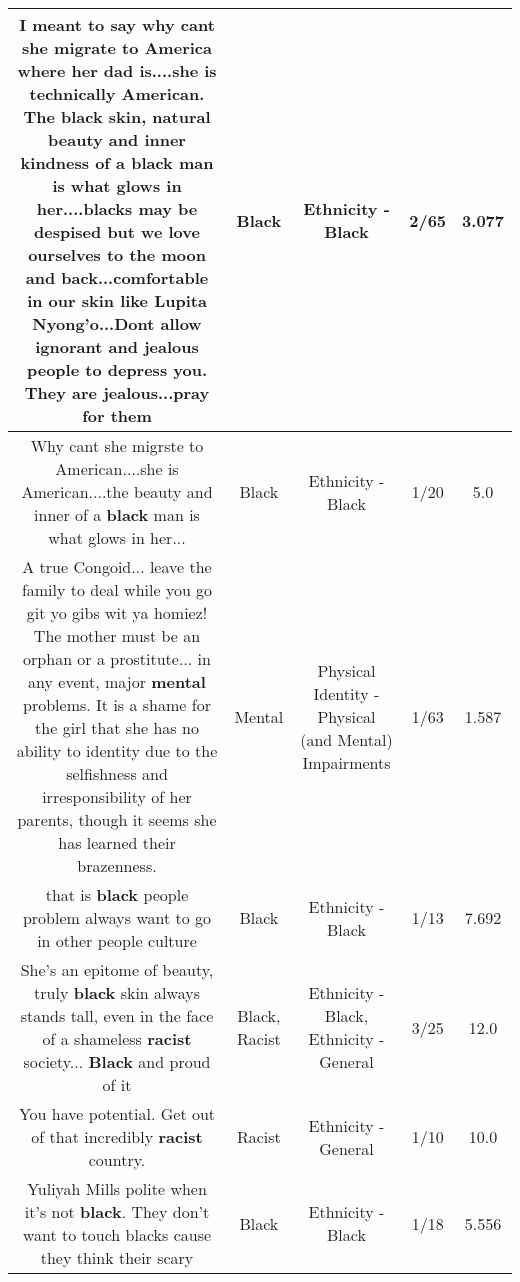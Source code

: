 \documentclass[11pt]{article}
\newlength\mylength
\begin{document}
\begin{center}
\begin{longtable}{|C{.65\mylength}|C{.30\mylength}|C{.12\mylength}|C{.12\mylength}|C{.12\mylength}|}
  \small I meant to say why cant she migrate to America where her dad is....she is technically American. The \textbf{black} skin, natural beauty and inner kindness of a \textbf{black} man is what glows in her....blacks may be despised but we love ourselves to the moon and back...comfortable in our skin like Lupita Nyong'o...Dont allow ignorant and jealous people to depress you. They are jealous...pray for them\normalsize   & Black & Ethnicity - Black & 2/65 & 3.077 \\  \hline
  \small Why cant she migrste to American....she is American....the beauty and inner of a \textbf{black} man is what glows in her...\normalsize   & Black & Ethnicity - Black & 1/20 & 5.0 \\  \hline
  \small A true Congoid... leave the family to deal while you go git yo gibs wit ya homiez!  The mother must be an orphan or a prostitute... in any event, major \textbf{mental} problems.  It is a shame for the girl that she has no ability to identity due to the selfishness and irresponsibility of her parents, though it seems she has learned their brazenness.\normalsize   & Mental & Physical Identity - Physical (and Mental) Impairments & 1/63 & 1.587 \\  \hline
  \small that is \textbf{black} people problem always want to go in other people culture\normalsize   & Black & Ethnicity - Black & 1/13 & 7.692 \\  \hline
  \small She's an epitome of beauty, truly \textbf{black} skin always stands tall, even in the face of a shameless \textbf{racist} society... \textbf{Black} and proud of it\normalsize   & Black, Racist & Ethnicity - Black, Ethnicity - General & 3/25 & 12.0 \\  \hline
  \small You have potential. Get out of that incredibly \textbf{racist} country.\normalsize   & Racist & Ethnicity - General & 1/10 & 10.0 \\  \hline
  \small Yuliyah Mills polite when it's not \textbf{black}. They don't want to touch blacks cause they think their scary\normalsize   & Black & Ethnicity - Black & 1/18 & 5.556 \\  \hline

\end{longtable}
\end{center}
\end{document}
